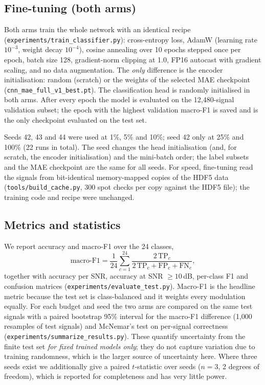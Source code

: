 \documentclass[11pt,a4paper]{article}
\begin{document}
\subsection{Fine-tuning (both arms)}
Both arms train the whole network with an identical recipe (\texttt{experiments/train\_classifier.py}): cross-entropy loss, AdamW (learning rate $10^{-3}$, weight decay $10^{-4}$), cosine annealing over 10 epochs stepped once per epoch, batch size 128, gradient-norm clipping at 1.0, FP16 autocast with gradient scaling, and no data augmentation. The \emph{only} difference is the encoder initialisation: random (scratch) or the weights of the selected MAE checkpoint (\texttt{cnn\_mae\_full\_v1\_best.pt}). The classification head is randomly initialised in both arms. After every epoch the model is evaluated on the 12,480-signal validation subset; the epoch with the highest validation macro-F1 is saved and is the only checkpoint evaluated on the test set.

Seeds 42, 43 and 44 were used at 1\%, 5\% and 10\%; seed 42 only at 25\% and 100\% (22 runs in total). The seed changes the head initialisation (and, for scratch, the encoder initialisation) and the mini-batch order; the label subsets and the MAE checkpoint are the same for all seeds. For speed, fine-tuning read the signals from bit-identical memory-mapped copies of the HDF5 data (\texttt{tools/build\_cache.py}, 300 spot checks per copy against the HDF5 file); the training code and recipe were unchanged.

\subsection{Metrics and statistics}
We report accuracy and macro-F1 over the 24 classes,
\begin{equation}
\text{macro-F1} = \frac{1}{24}\sum_{c=1}^{24} \frac{2\,\mathrm{TP}_c}{2\,\mathrm{TP}_c+\mathrm{FP}_c+\mathrm{FN}_c},
\end{equation}
together with accuracy per SNR, accuracy at SNR $\ge 10$\,dB, per-class F1 and confusion matrices (\texttt{experiments/evaluate\_test.py}). Macro-F1 is the headline metric because the test set is class-balanced and it weights every modulation equally.
For each budget and seed the two arms are compared on the same test signals with a paired bootstrap 95\% interval for the macro-F1 difference (1,000 resamples of test signals) and McNemar's test on per-signal correctness \citep{mcnemar1947} (\texttt{experiments/summarize\_results.py}). These quantify uncertainty from the finite test set \emph{for fixed trained models only}; they do not capture variation due to training randomness, which is the larger source of uncertainty here. Where three seeds exist we additionally give a paired $t$-statistic over seeds ($n=3$, 2 degrees of freedom), which is reported for completeness and has very little power.
\end{document}
